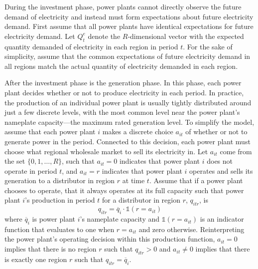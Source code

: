 During the investment phase, power plants cannot directly observe the future demand of electricity and instead must form expectations about future electricity demand. First assume that all power plants have identical expectations for future electricity demand. Let $Q_t^e$ denote the $R$-dimensional vector with the expected quantity demanded of electricity in each region in period $t$. For the sake of simplicity, assume that the common expectations of future electricity demand in all regions match the actual quantity of electricity demanded in each region. 

After the investment phase is the generation phase. In this phase, each power plant decides whether or not to produce electricity in each period. In practice, the production of an individual power plant is usually tightly distributed around just a few discrete levels, with the most common level near the power plant's nameplate capacity---the maximum rated generation level. To simplify the model, assume that each power plant $i$ makes a discrete choice $a_{it}$ of whether or not to generate power in the period. Connected to this decision, each power plant must choose what regional wholesale market to sell its electricity in. Let $a_{it}$ come from the set $\{0, 1, \ldots, R\}$, such that $a_{it} = 0$ indicates that power plant $i$ does not operate in period $t$, and $a_{it} = r$ indicates that power plant $i$ operates and sells its generation to a distributor in region $r$ at time $t$. Assume that if a power plant chooses to operate, that it always operates at its full capacity such that power plant $i$'s production in period $t$ for a distributor in region $r$,  $q_{itr}$, is
\begin{equation}
    q_{itr} = \overline{q}_i \cdot \mathds{1}(r = a_{it})
\end{equation}
where $\overline{q}_i$ is power plant $i$'s nameplate capacity and $\mathds{1}(r = a_{it})$ is an indicator function that evaluates to one when $r = a_{it}$ and zero otherwise. Reinterpreting the power plant's operating decision within this production function, $a_{it} = 0$ implies that there is no region $r$ such that $q_{itr} > 0$ and $a_{it} \neq 0$ implies that there is exactly one region $r$ such that $q_{itr} = \overline{q}_i$. 

